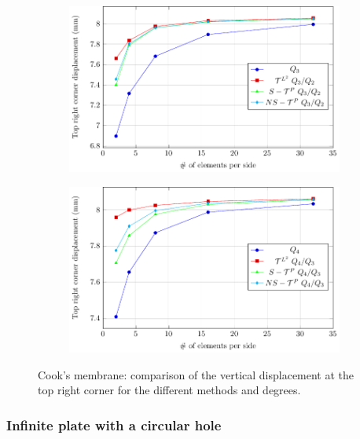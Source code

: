 \begin{figure}[H]
    \ContinuedFloat
    \centering

    \begin{subfigure}[b]{\textwidth}
        \centering
        \includegraphics[width=.62\linewidth]{Cook's_membrane_Q3}
    \end{subfigure}
    \centering
    \begin{subfigure}[b]{\textwidth}
        \centering
        \includegraphics[width=.62\linewidth]{Cook's_membrane_Q4}
    \end{subfigure}
    \caption{Cook's membrane: comparison of the vertical displacement at the top right corner for the different methods and degrees.}
    \label{fig:Cook's_result}
\end{figure}
\subsubsection{Infinite plate with a circular hole}

